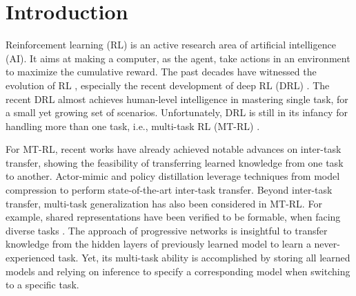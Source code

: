 \documentclass[letterpaper]{article} %
\begin{document}
\section{Introduction}
Reinforcement learning (RL) is an active research area of artificial intelligence (AI). It aims at making a computer, as the agent, take actions in an environment to maximize the cumulative reward. The past decades have witnessed the evolution of RL \cite{sutton1998reinforcement}, especially the recent development of deep RL (DRL) \cite{mnih2015human}. The recent DRL almost achieves human-level intelligence in mastering single task, for a small yet growing set of scenarios. Unfortunately, DRL is still in its infancy for handling more than one task, i.e., multi-task RL (MT-RL) \cite{caruana1998multitask}.

For MT-RL, recent works have already achieved notable advances on inter-task transfer, showing the feasibility of transferring learned knowledge from one task to another. Actor-mimic \cite{parisotto16_actormimic} and policy distillation \cite{rusu2015policy} leverage techniques from model compression to perform state-of-the-art inter-task transfer. Beyond inter-task transfer, multi-task generalization has also been considered in MT-RL. For example, shared representations have been verified to be formable, when facing diverse tasks \cite{borsa2016learning,romoff2016deep}. The approach of progressive networks \cite{rusu2016progressive} is insightful to transfer knowledge from the hidden layers of previously learned model to learn a never-experienced task. Yet, its multi-task ability is accomplished by storing all learned models and relying on inference to specify a corresponding model when switching to a specific task.
\end{document}

